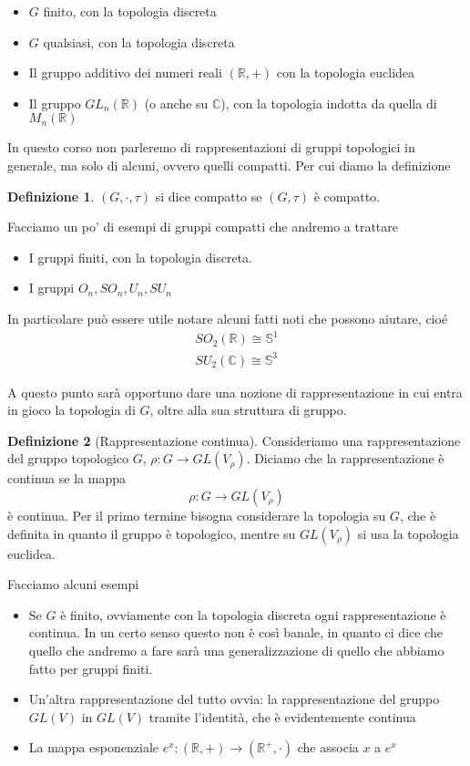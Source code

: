 \documentclass[11pt]{article}
\theoremstyle{plain}
\theoremstyle{definition}
\newtheorem{defn}{Definizione}[section]
\theoremstyle{remark}
\newcommand{\C}{\mathbb{C}}
\newcommand{\R}{\mathbb{R}}
\begin{document}
\begin{itemize}
\item $G$ finito, con la topologia discreta
\item $G$ qualsiasi, con la topologia discreta
\item Il gruppo additivo dei numeri reali $(\R, +)$ con la topologia euclidea
\item Il gruppo $GL_n (\R)$ (o anche su $\C$), con la topologia indotta da quella di $M_n(\R)$

\end{itemize}


In questo corso non parleremo di rappresentazioni di gruppi topologici in generale, ma solo di alcuni, ovvero quelli compatti. Per cui diamo la definizione

\begin{defn}
$(G, \cdot, \tau)$ si dice compatto se $(G, \tau)$ è compatto.
\end{defn}


Facciamo un po' di esempi di gruppi compatti che andremo a trattare
\begin{itemize}
\item I gruppi finiti, con la topologia discreta.
\item I gruppi $O_n, SO_n, U_n, SU_n$
\end{itemize}

In particolare può essere utile notare alcuni fatti noti che possono aiutare, cioé
\begin{align*}
SO_2(\R) \cong \mathbb{S}^1 \\
SU_2(\C) \cong \mathbb{S}^3
\end{align*}

A questo punto sarà opportuno dare una nozione di rappresentazione in cui entra in gioco la topologia di $G$, oltre alla sua struttura di gruppo. 
\begin{defn}[Rappresentazione continua]
Consideriamo una rappresentazione del gruppo topologico $G$, $\rho: G \to GL(V_\rho)$. Diciamo che la rappresentazione è continua se la mappa
\[ \rho: G \to GL(V_\rho)\]
è continua. Per il primo termine bisogna considerare la topologia su $G$, che è definita in quanto il gruppo è topologico, mentre su $GL(V_\rho)$ si usa la topologia euclidea. 
\end{defn}

Facciamo alcuni esempi
\begin{itemize}
\item Se $G$ è finito, ovviamente con la topologia discreta ogni rappresentazione è continua. In un certo senso questo non è così banale, in quanto ci dice che quello che andremo a fare sarà una generalizzazione di quello che abbiamo fatto per gruppi finiti.
\item Un'altra rappresentazione del tutto ovvia: la rappresentazione del gruppo $GL(V)$ in $GL(V)$ tramite l'identità, che è evidentemente continua
\item La mappa esponenziale $e^x: (\R, +) \to (\R^+, \cdot )$ che associa $x$ a $e^x$
\end{itemize}
\end{document}
